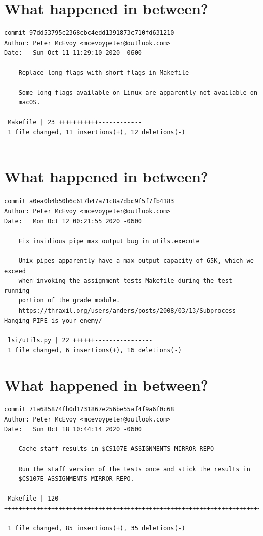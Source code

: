 \documentclass{article}
\begin{document}
\newpage

\section*{What happened in between?}
\vspace{2ex}
\begin{verbatim}
commit 97dd53795c2368cbc4edd1391873c710fd631210
Author: Peter McEvoy <mcevoypeter@outlook.com>
Date:   Sun Oct 11 11:29:10 2020 -0600

    Replace long flags with short flags in Makefile
    
    Some long flags available on Linux are apparently not available on
    macOS.

 Makefile | 23 +++++++++++------------
 1 file changed, 11 insertions(+), 12 deletions(-)


\end{verbatim}

\newpage


\section*{What happened in between?}
\vspace{2ex}
\begin{verbatim}
commit a0ea0b4b50b6c617b47a71c8a7dbc9f5f7fb4183
Author: Peter McEvoy <mcevoypeter@outlook.com>
Date:   Mon Oct 12 00:21:55 2020 -0600

    Fix insidious pipe max output bug in utils.execute
    
    Unix pipes apparently have a max output capacity of 65K, which we exceed
    when invoking the assignment-tests Makefile during the test-running
    portion of the grade module.
    https://thraxil.org/users/anders/posts/2008/03/13/Subprocess-Hanging-PIPE-is-your-enemy/

 lsi/utils.py | 22 ++++++----------------
 1 file changed, 6 insertions(+), 16 deletions(-)

\end{verbatim}

\newpage

\section*{What happened in between?}
\vspace{2ex}
\begin{verbatim}
commit 71a685874fb0d1731867e256be55af4f9a6f0c68
Author: Peter McEvoy <mcevoypeter@outlook.com>
Date:   Sun Oct 18 10:44:14 2020 -0600

    Cache staff results in $CS107E_ASSIGNMENTS_MIRROR_REPO
    
    Run the staff version of the tests once and stick the results in
    $CS107E_ASSIGNMENTS_MIRROR_REPO.

 Makefile | 120 +++++++++++++++++++++++++++++++++++++++++++++++++++++++++++++++++++++++++++++++++++++-----------------------------------
 1 file changed, 85 insertions(+), 35 deletions(-)


\end{verbatim}
\end{document}
